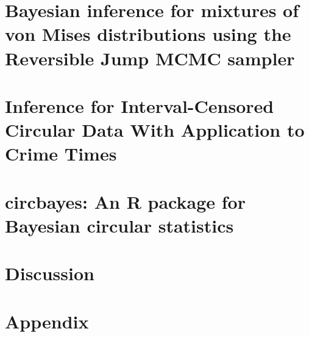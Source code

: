 \documentclass[12pt, a4paper]{book}\usepackage[]{graphicx}\usepackage[]{color}
\begin{document}
\chapter{Bayesian inference for mixtures of von Mises distributions using the Reversible Jump MCMC sampler}
\label{revrjump}

%
\chapter{Inference for Interval-Censored Circular Data With Application to Crime Times}
\label{dpm_crim}



\chapter{circbayes: An R package for Bayesian circular statistics}
\label{circbays}
% 


\chapter{Discussion}




\chapter{Appendix}

\appendix






\backmatter



\end{document}
